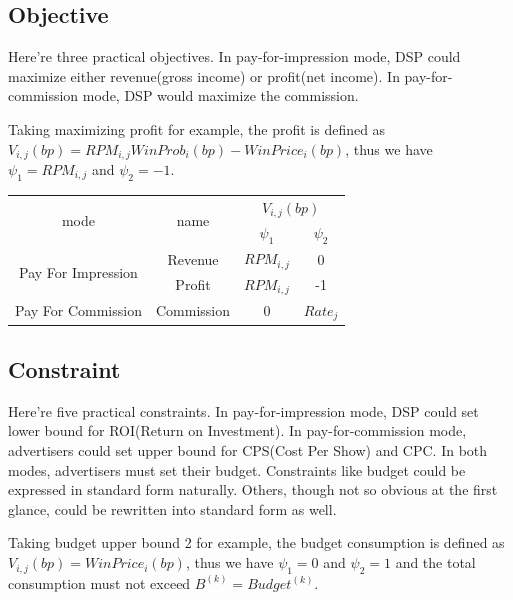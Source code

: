\documentclass{article}
\theoremstyle{definition}
\newcommand{\sV}{V_{i,j}}
\newcommand{\sB}{B^{(k)}}
\newcommand{\sRPM}{RPM_{i,j}}
\newcommand{\pprob}{\psi_1}
\newcommand{\pprice}{\psi_2}
\begin{document}
\begin{CJK}{UTF8}{gbsn}
\subsection{Objective}

Here're three practical objectives.
In pay-for-impression mode, DSP could maximize either revenue(gross income) or profit(net income).
In pay-for-commission mode, DSP would maximize the commission. 

Taking maximizing profit for example, the profit is defined as $\sV(bp)=\sRPM{}WinProb_i(bp)-WinPrice_i(bp)$,
    thus we have $\pprob=\sRPM$ and $\pprice=-1$.

\begin{center}
\begin{tabular}{|c|c|c|c|}
\hline
\multirow{2}{*}{mode}               & \multirow{2}{*}{name}       & \multicolumn{2}{c|}{$\sV(bp)$} \\
\cline{3-4}
                                    &                             & $\pprob$       & $\pprice$ \\
\hline
\multirow{2}{*}{Pay For Impression} & Revenue                     & $\sRPM$    & 0 \\
\cline{2-4}
                                    & Profit                      & $\sRPM$    & -1 \\
\hline
\multirow{1}{*}{Pay For Commission} & Commission                  & 0              &$Rate_j$ \\
\hline
\end{tabular}
\end{center}

\subsection{Constraint}

Here're five practical constraints.
In pay-for-impression mode, DSP could set lower bound for ROI(Return on Investment).
In pay-for-commission mode, advertisers could set upper bound for CPS(Cost Per Show) and CPC.
In both modes, advertisers must set their budget.
Constraints like budget could be expressed in standard form naturally.
Others, though not so obvious at the first glance, could be rewritten into standard form as well.

Taking budget upper bound 2 for example, the budget consumption is defined as $\sV(bp)=WinPrice_i(bp)$,
    thus we have $\pprob=0$ and $\pprice=1$ and the total consumption must not exceed $\sB=Budget^{(k)}$.


\end{CJK}
\end{document}
